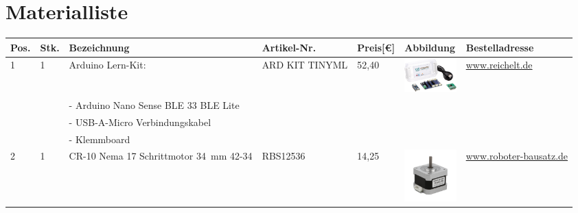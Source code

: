 %


\chapter{Materialliste} \label{MLL}
\begin{center}
	\fontsize{8}{10}\selectfont
	\begin{tabularx}{\linewidth}{|p{0.4cm}|p{0.4cm}|X|X|p{1cm}|X|X|}
		\hline 
		\textbf{Pos.} & \textbf{Stk.} & \textbf{Bezeichnung} & \textbf{Artikel-Nr.}& \textbf{Preis[€]} & \textbf{Abbildung} & \textbf{Bestelladresse} \\ \hline
		1 & 1 & Arduino Lern-Kit: & ARD KIT TINYML & 52,40 & 
			
 \includegraphics[width=2cm]{Images/Material/Arduino.png} 	  & \href{https://www.reichelt.de/sg/de/arduino-lern-kit-tiny-machine-ard-kit-tinyml-p304338.html}{www.reichelt.de} \\
		&   & - Arduino Nano Sense BLE 33 BLE Lite & & & \\ 
		&   &- USB-A-Micro Verbindungskabel & & & \\
		&   &- Klemmboard & & & \\
		\hline
		2 & 1 & CR-10 Nema 17 Schrittmotor 34\ mm 42-34 & RBS12536 & 14,25  & \includegraphics[width=2cm]{Images/Material/RBS12536.png} & \href{https://www.roboter-bausatz.de/p/cr-10-nema-17-schrittmotor-34mm-42-34}{www.roboter-bausatz.de} \\
		\hline
		

\end{tabularx}
\end{center}

